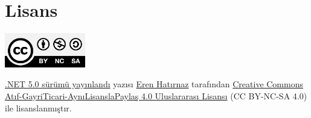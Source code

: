 \documentclass[11pt]{article}
\begin{document}
\section{Lisans}
\label{sec:orgf3edcd3}
\begin{center}
\begin{center}
\includegraphics[height=1.5cm]{../../../img/CC_BY-NC-SA_4.0.png}
\end{center}

\href{dotnet-5-0.org}{.NET 5.0 sürümü yayınlandı} yazısı \href{https://erenhatirnaz.github.io}{Eren Hatırnaz} tarafından \href{http://creativecommons.org/licenses/by-nc-sa/4.0/}{Creative Commons
Atıf-GayriTicari-AynıLisanslaPaylaş 4.0 Uluslararası Lisansı} (CC BY-NC-SA 4.0)
ile lisanslanmıştır.
\end{center}
\end{document}
